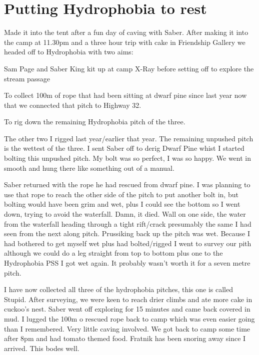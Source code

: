 \section{Putting Hydrophobia to rest}

Made it into the tent after a fun day of caving with Saber. After making it into the camp at 11.30pm and a three hour trip with cake in Friendship Gallery we headed off to Hydrophobia  with two aims: 

\begin{marginfigure}
\centering
\vspace{100pt}
\label{sam toothbrush}
\caption{Sam Page and Saber King kit up at camp X-Ray before setting off to explore the \protect{} stream passage }
\end{marginfigure}


\begin{citemize} 
 \item To collect 100m of rope that had been sitting at dwarf pine since last year now that we connected that pitch to Highway 32.  
 \item To rig down the remaining Hydrophobia pitch of the three. 
 \end{citemize}
 
 The other two I rigged last year/earlier that year.  The remaining unpushed pitch is the wettest of the three. I sent Saber off to derig Dwarf Pine whist I started bolting this unpushed pitch. My bolt was so perfect, I was so happy. We went in smooth and hung there like something out of a manual. 

Saber returned with the rope he had rescued from dwarf pine.  I was planning to use that rope to reach the other side of the pitch  to put another bolt in, but bolting would have been grim and wet, plus I could see the bottom so I went down, trying to avoid the waterfall. Damn, it died. Wall on one side, the water from the waterfall heading through a tight rift/crack presumably the same I had seen from the next along pitch. Prussiking back up the pitch was wet. Because I had bothered to get myself wet plus had bolted/rigged I went to survey our pith although we could do a leg straight from top to bottom plus one to the Hydrophobia PSS I got wet again. It probably wasn't worth it for a seven metre pitch.

I have now collected all three of the hydrophobia pitches, this one is called Stupid. After surveying, we were keen to reach drier climbs and ate more cake in cuckoo's nest. Saber went off exploring for 15 minutes and came back covered in mud. I lugged the 100m o rescued rope back to camp which was even easier going than I remembered. Very little caving involved. We got back to camp some time after 8pm and had tomato themed food. Fratnik has been snoring away since I arrived. This bodes well.



